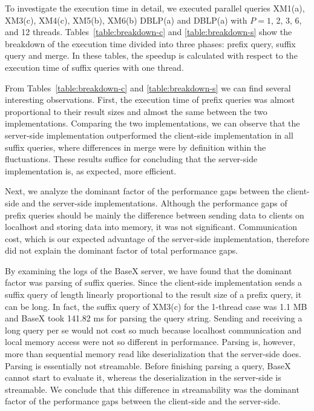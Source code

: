 To investigate the execution time in detail, we executed parallel queries
XM1(a), XM3(c), XM4(c), XM5(b), XM6(b) DBLP(a) and DBLP(a) with $P=1$, 2, 3, 6,
and 12 threads. Tables~\ref{table:breakdown-c} and \ref{table:breakdown-s} show
the breakdown of the execution time divided into three phases: prefix query,
suffix query and merge. In these tables, the speedup is calculated with respect
to the execution time of suffix queries with one thread.

From Tables~\ref{table:breakdown-c} and \ref{table:breakdown-s} we can find
several interesting observations. First, the execution time of prefix queries
was almost proportional to their result sizes and almost the same between the
two implementations. Comparing the two implementations, we can observe that the
server-side implementation outperformed the client-side implementation in all
suffix queries, where differences in merge were by definition within the
fluctuations.  These results suffice for concluding that the server-side
implementation is, as expected, more efficient.

Next, we analyze the dominant factor of the performance gaps between the
client-side and the server-side implementations. Although the performance gaps
of prefix queries should be mainly the difference between sending data to
clients on localhost and storing data into memory, it was not significant.
Communication cost, which is our expected advantage of the server-side
implementation, therefore did not explain the dominant factor of total
performance gaps.

By examining the logs of the BaseX server, we have found that the dominant
factor was parsing of suffix queries. Since the client-side implementation sends
a suffix query of length linearly proportional to the result size of a prefix
query, it can be long. In fact, the suffix query of XM3(c) for the 1-thread case
was 1.1 MB and BaseX took 141.82 ms for parsing the query string. Sending and
receiving a long query per se would not cost so much because localhost
communication and local memory access were not so different in performance.
Parsing is, however, more than sequential memory read like deserialization that
the server-side does. Parsing is essentially not streamable. Before finishing
parsing a query, BaseX cannot start to evaluate it, whereas the deserialization
in the server-side is streamable. We conclude that this difference in
streamability was the dominant factor of the performance gaps between the
client-side and the server-side.

